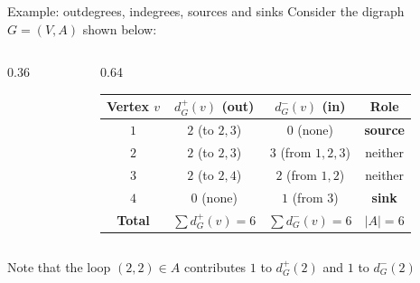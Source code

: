 \documentclass[aspectratio=169]{beamer}\usepackage[]{graphicx}\usepackage[]{xcolor}
\begin{document}
\begin{frame}{Example: outdegrees, indegrees, sources and sinks}
Consider the digraph $G = (V, A)$ shown below:
\vfill
\begin{columns}[c]
\begin{column}{0.36\textwidth}
\centering
{}
\end{column}
\begin{column}{0.64\textwidth}
\centering
\renewcommand{\arraystretch}{1.25}
\begin{tabular}{@{}cccc@{}}
\toprule
\textbf{Vertex $v$} & \textbf{$d_G^+(v)$ (out)} & \textbf{$d_G^-(v)$ (in)} & \textbf{Role} \\
\midrule
$1$ & $2$ (to $2, 3$) & $0$ (none) & \textbf{source} \\
$2$ & $2$ (to $2, 3$) & $3$ (from $1, 2, 3$) & neither \\
$3$ & $2$ (to $2, 4$) & $2$ (from $1, 2$) & neither \\
$4$ & $0$ (none) & $1$ (from $3$) & \textbf{sink} \\
\midrule
\textbf{Total} & $\sum d_G^+(v) = 6$ & $\sum d_G^-(v) = 6$ & $|A| = 6$ \\
\bottomrule
\end{tabular}
\end{column}
\end{columns}
\vfill
Note that the loop $(2, 2) \in A$ contributes $1$ to $d_G^+(2)$ and $1$ to $d_G^-(2)$
\end{frame}
\end{document}
